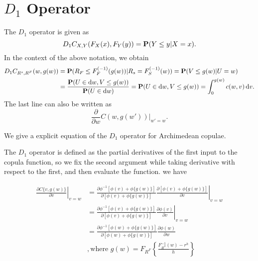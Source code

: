
\section{$D_1$ Operator}

The $D_1$ operator is given as
\begin{equation*}
    D_1 C_{X,Y}(F_X(x), F_Y(y)) = {\bf P}(Y\leq y|X=x).
\end{equation*}
In the context of the above notation, we obtain
\begin{align*}
  D_1 C_{R^s, R^F}(w, g(w)) &= \p(R_F\leq F_{F}^{(-1)}(g(w))|
  R_s=F_S^{(-1)}(w)) %
  = \p(V\leq g(w)| U=w)\\ %
  &= \frac{\p(U\in \dd w, V\leq g(w))} {\p(U\in \dd w)} %
  = \p(U\in \dd w, V\leq g(w)) %
  = \int_0^{g(w)} c(w,v)\, \dd v. 
\end{align*}
The last line can also be written as
\begin{equation*}
  \frac{\partial }{\partial w} C(w, g(w')) \big|_{w'=w}. 
\end{equation*}



We give a explicit equation of the $D_1$ operator for Archimedean copulae.

The $D_1$ operator is defined as the partial derivatives of the first input to the copula function,
so we fix the second argument while taking derivative with respect to the first, and then evaluate the function.
we have

\begin{align}
\left.\frac{\partial C\{v, g(w)\}}{\partial v} \right\vert_{v=w}
&=
\left.\frac{\partial  \phi^{-1}[\phi(v)+\phi\{g(w)\}]}
{\partial  [\phi(v)+\phi\{g(w)\}]}
\frac{\partial  [\phi(v)+\phi\{g(w)\}]}
{\partial  v}
\right\vert_{v=w}\\
&=
\left.\frac{\partial   \phi^{-1}[\phi(v)+\phi\{g(w)\}]}
{\partial [\phi(v)+\phi\{g(w)\}]}
\frac{\partial  \phi(v)}{\partial  v}
\right\vert_{v=w}\\
&=
\frac{\partial \phi^{-1}[\phi(w)+\phi\{g(w)\}]}
{\partial [\phi(w)+\phi\{g(w)\}]}
\frac{\partial  \phi(w)}{\partial  w}\\
&,
\text{where } g(w) = F_{R^F}\left\{\frac{F^{-1}_{R^S}(w)-r^h}{h}\right\}\\
\end{align}

